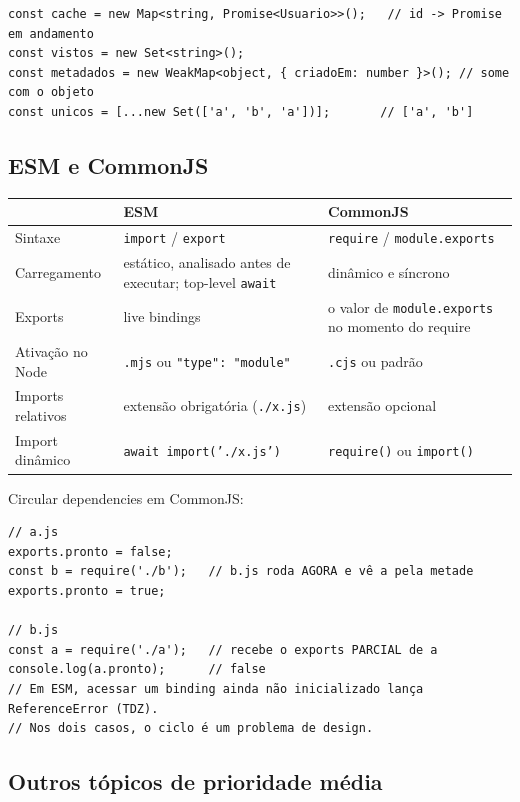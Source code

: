 \documentclass[12pt,a4paper,oneside]{book}
\newcommand{\code}[1]{\texttt{#1}}
\begin{document}
\begin{verbatim}
const cache = new Map<string, Promise<Usuario>>();   // id -> Promise em andamento
const vistos = new Set<string>();
const metadados = new WeakMap<object, { criadoEm: number }>(); // some com o objeto
const unicos = [...new Set(['a', 'b', 'a'])];       // ['a', 'b']
\end{verbatim}

\subsection{ESM e CommonJS}

{\small
\begin{tabularx}{\textwidth}{@{}lXX@{}}
\toprule
 & \textbf{ESM} & \textbf{CommonJS} \\
\midrule
Sintaxe & \code{import} / \code{export} & \code{require} / \code{module.exports} \\
Carregamento & estático, analisado antes de executar; top-level \code{await} & dinâmico e síncrono \\
Exports & live bindings & o valor de \code{module.exports} no momento do require \\
Ativação no Node & \code{.mjs} ou \code{"type": "module"} & \code{.cjs} ou padrão \\
Imports relativos & extensão obrigatória (\code{./x.js}) & extensão opcional \\
Import dinâmico & \code{await import('./x.js')} & \code{require()} ou \code{import()} \\
\bottomrule
\end{tabularx}
}

Circular dependencies em CommonJS:

\begin{verbatim}
// a.js
exports.pronto = false;
const b = require('./b');   // b.js roda AGORA e vê a pela metade
exports.pronto = true;

// b.js
const a = require('./a');   // recebe o exports PARCIAL de a
console.log(a.pronto);      // false
// Em ESM, acessar um binding ainda não inicializado lança ReferenceError (TDZ).
// Nos dois casos, o ciclo é um problema de design.
\end{verbatim}

\subsection{Outros tópicos de prioridade média}
\end{document}
